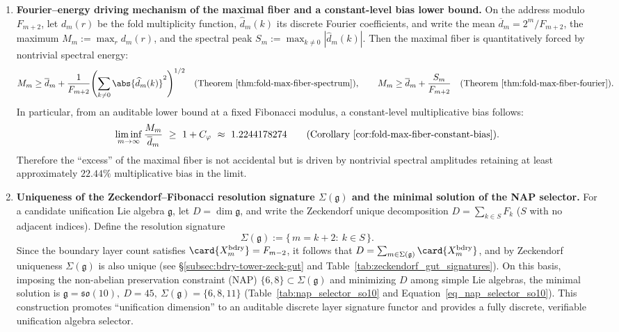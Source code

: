 \begin{enumerate}
  \item \textbf{Fourier--energy driving mechanism of the maximal fiber and a constant-level bias lower bound.}
  On the address modulo \(F_{m+2}\), let \(d_m(r)\) be the fold multiplicity function, \(\widehat d_m(k)\) its discrete Fourier coefficients,
  and write the mean \(\overline d_m=2^m/F_{m+2}\), the maximum \(M_m:=\max_r d_m(r)\), and the spectral peak \(S_m:=\max_{k\neq 0}|\widehat d_m(k)|\).
  Then the maximal fiber is quantitatively forced by nontrivial spectral energy:
  \[
  M_m\ge \overline d_m+\frac{1}{F_{m+2}}\Biggl(\sum_{k\ne 0}\abs{\widehat d_m(k)}^2\Biggr)^{1/2}
  \quad\text{(Theorem~\ref{thm:fold-max-fiber-spectrum})},
  \qquad
  M_m\ge \overline d_m+\frac{S_m}{F_{m+2}}
  \quad\text{(Theorem~\ref{thm:fold-max-fiber-fourier})}.
  \]
  In particular, from an auditable lower bound at a fixed Fibonacci modulus, a constant-level multiplicative bias follows:
  \[
  \liminf_{m\to\infty}\frac{M_m}{\overline d_m}\ \ge\ 1+C_\varphi\ \approx\ 1.2244178274
  \qquad\text{(Corollary~\ref{cor:fold-max-fiber-constant-bias})}.
  \]
  Therefore the ``excess'' of the maximal fiber is not accidental but is driven by nontrivial spectral amplitudes retaining at least approximately \(22.44\%\) multiplicative bias in the limit.

  \item \textbf{Uniqueness of the Zeckendorf--Fibonacci resolution signature \texorpdfstring{$\Sigma(\mathfrak g)$}{Sigma(g)} and the minimal solution of the NAP selector.}
  For a candidate unification Lie algebra \(\mathfrak g\), let \(D=\dim\mathfrak g\), and write the Zeckendorf unique decomposition
  \(D=\sum_{k\in S}F_k\) (\(S\) with no adjacent indices).
  Define the resolution signature
  \[
  \Sigma(\mathfrak g):=\{\,m=k+2:\ k\in S\,\}.
  \]
  Since the boundary layer count satisfies \(\card{X_m^{\mathrm{bdry}}}=F_{m-2}\), it follows that
  \(D=\sum_{m\in\Sigma(\mathfrak g)}\card{X_m^{\mathrm{bdry}}}\), and by Zeckendorf uniqueness \(\Sigma(\mathfrak g)\) is also unique (see \S\ref{subsec:bdry-tower-zeck-gut} and Table~\ref{tab:zeckendorf_gut_signatures}).
  On this basis, imposing the non-abelian preservation constraint (NAP) \(\{6,8\}\subset \Sigma(\mathfrak g)\) and minimizing \(D\) among simple Lie algebras, the minimal solution is
  \(
  \mathfrak g=\mathfrak{so}(10),\ D=45,\ \Sigma(\mathfrak g)=\{6,8,11\}
  \)
  (Table~\ref{tab:nap_selector_so10} and Equation~\ref{eq_nap_selector_so10}).
  This construction promotes ``unification dimension'' to an auditable discrete layer signature functor and provides a fully discrete, verifiable unification algebra selector.


\end{enumerate}
